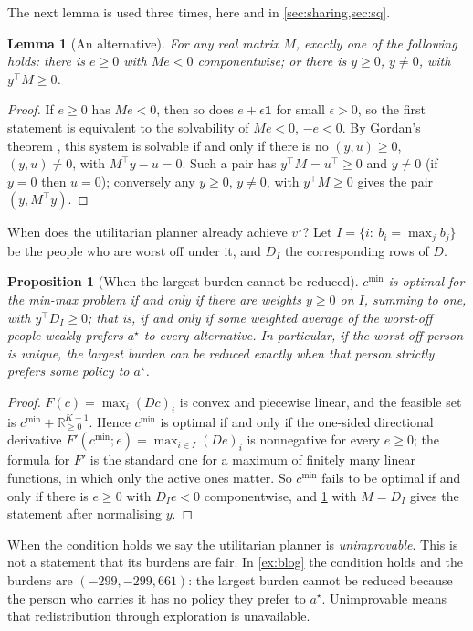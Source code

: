 \documentclass[11pt,a4paper]{article}
\theoremstyle{plain}
\newtheorem{lemma}[theorem]{Lemma}
\newtheorem{proposition}[theorem]{Proposition}
\theoremstyle{definition}
\theoremstyle{remark}
\newcommand{\R}{\mathbb{R}}
\newcommand{\cmin}{c^{\min}}
\newcommand{\astar}{a^\star}
\begin{document}
The next lemma is used three times, here and in \cref{sec:sharing,sec:sq}.

\begin{lemma}[An alternative]\label{lem:alt}
For any real matrix $M$, exactly one of the following holds: there is $e\ge0$ with $Me<0$ componentwise; or there is $y\ge0$, $y\neq0$, with $y^\top M\ge0$.
\end{lemma}

\begin{proof}
If $e\ge0$ has $Me<0$, then so does $e+\epsilon\mathbf 1$ for small $\epsilon>0$, so the first statement is equivalent to the solvability of $Me<0$, $-e<0$. By Gordan's theorem \citep[Ch.~2]{mangasarian1969}, this system is solvable if and only if there is no $(y,u)\ge0$, $(y,u)\neq0$, with $M^\top y-u=0$. Such a pair has $y^\top M=u^\top\ge0$ and $y\neq0$ (if $y=0$ then $u=0$); conversely any $y\ge0$, $y\neq0$, with $y^\top M\ge0$ gives the pair $(y,M^\top y)$.
\end{proof}

When does the utilitarian planner already achieve $v^\star$? Let $I=\{i:\ b_i=\max_jb_j\}$ be the people who are worst off under it, and $D_I$ the corresponding rows of $D$.

\begin{proposition}[When the largest burden cannot be reduced]\label{prop:ville}
$\cmin$ is optimal for the min-max problem if and only if there are weights $y\ge0$ on $I$, summing to one, with $y^\top D_I\ge0$; that is, if and only if some weighted average of the worst-off people weakly prefers $\astar$ to every alternative. In particular, if the worst-off person is unique, the largest burden can be reduced exactly when that person strictly prefers some policy to $\astar$.
\end{proposition}

\begin{proof}
$F(c)=\max_i(Dc)_i$ is convex and piecewise linear, and the feasible set is $\cmin+\R^{K-1}_{\ge0}$. Hence $\cmin$ is optimal if and only if the one-sided directional derivative $F'(\cmin;e)=\max_{i\in I}(De)_i$ is nonnegative for every $e\ge0$; the formula for $F'$ is the standard one for a maximum of finitely many linear functions, in which only the active ones matter. So $\cmin$ fails to be optimal if and only if there is $e\ge0$ with $D_Ie<0$ componentwise, and \cref{lem:alt} with $M=D_I$ gives the statement after normalising $y$.
\end{proof}

When the condition holds we say the utilitarian planner is \emph{unimprovable}. This is not a statement that its burdens are fair. In \cref{ex:blog} the condition holds and the burdens are $(-299,-299,661)$: the largest burden cannot be reduced because the person who carries it has no policy they prefer to $\astar$. Unimprovable means that redistribution through exploration is unavailable.
\end{document}
